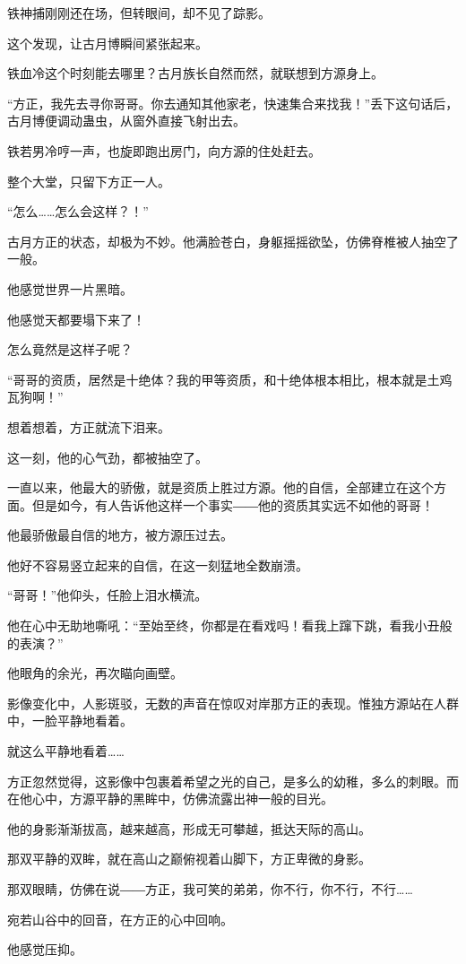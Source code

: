 \begin{this_body}
铁神捕刚刚还在场，但转眼间，却不见了踪影。

这个发现，让古月博瞬间紧张起来。

铁血冷这个时刻能去哪里？古月族长自然而然，就联想到方源身上。

“方正，我先去寻你哥哥。你去通知其他家老，快速集合来找我！”丢下这句话后，古月博便调动蛊虫，从窗外直接飞射出去。

铁若男冷哼一声，也旋即跑出房门，向方源的住处赶去。

整个大堂，只留下方正一人。

“怎么……怎么会这样？！”

古月方正的状态，却极为不妙。他满脸苍白，身躯摇摇欲坠，仿佛脊椎被人抽空了一般。

他感觉世界一片黑暗。

他感觉天都要塌下来了！

怎么竟然是这样子呢？

“哥哥的资质，居然是十绝体？我的甲等资质，和十绝体根本相比，根本就是土鸡瓦狗啊！”

想着想着，方正就流下泪来。

这一刻，他的心气劲，都被抽空了。

一直以来，他最大的骄傲，就是资质上胜过方源。他的自信，全部建立在这个方面。但是如今，有人告诉他这样一个事实――他的资质其实远不如他的哥哥！

他最骄傲最自信的地方，被方源压过去。

他好不容易竖立起来的自信，在这一刻猛地全数崩溃。

“哥哥！”他仰头，任脸上泪水横流。

他在心中无助地嘶吼：“至始至终，你都是在看戏吗！看我上蹿下跳，看我小丑般的表演？”

他眼角的余光，再次瞄向画壁。

影像变化中，人影斑驳，无数的声音在惊叹对岸那方正的表现。惟独方源站在人群中，一脸平静地看着。

就这么平静地看着……

方正忽然觉得，这影像中包裹着希望之光的自己，是多么的幼稚，多么的刺眼。而在他心中，方源平静的黑眸中，仿佛流露出神一般的目光。

他的身影渐渐拔高，越来越高，形成无可攀越，抵达天际的高山。

那双平静的双眸，就在高山之巅俯视着山脚下，方正卑微的身影。

那双眼睛，仿佛在说――方正，我可笑的弟弟，你不行，你不行，不行……

宛若山谷中的回音，在方正的心中回响。

他感觉压抑。


\end{this_body}
